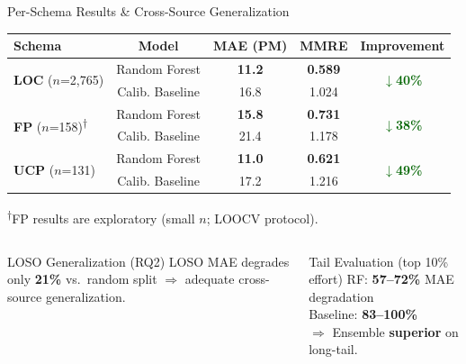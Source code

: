 \documentclass[aspectratio=169]{beamer}
\begin{document}
\begin{frame}{Per-Schema Results \& Cross-Source Generalization}

\begin{table}
\centering
{\setlength{\tabcolsep}{6pt}\footnotesize
\begin{tabular}{lcccc}
\toprule
\textbf{Schema} & \textbf{Model} & \textbf{MAE (PM)} & \textbf{MMRE} & \textbf{Improvement} \\
\midrule
\multirow{2}{*}{\textbf{LOC} ($n$=2,765)}
  & Random Forest        & \textbf{11.2} & \textbf{0.589} & \multirow{2}{*}{\textcolor{darkgreen}{\textbf{$\downarrow$40\%}}} \\
  & Calib. Baseline      & 16.8          & 1.024          & \\
\midrule
\multirow{2}{*}{\textbf{FP} ($n$=158)\textsuperscript{$\dagger$}}
  & Random Forest        & \textbf{15.8} & \textbf{0.731} & \multirow{2}{*}{\textcolor{darkgreen}{\textbf{$\downarrow$38\%}}} \\
  & Calib. Baseline      & 21.4          & 1.178          & \\
\midrule
\multirow{2}{*}{\textbf{UCP} ($n$=131)}
  & Random Forest        & \textbf{11.0} & \textbf{0.621} & \multirow{2}{*}{\textcolor{darkgreen}{\textbf{$\downarrow$49\%}}} \\
  & Calib. Baseline      & 17.2          & 1.216          & \\
\bottomrule
\end{tabular}}
\end{table}
{\tiny \textsuperscript{$\dagger$}FP results are exploratory (small $n$; LOOCV protocol).}

\vspace{0.1cm}
\begin{columns}[T]
\begin{exampleblock}{LOSO Generalization (RQ2)}
\small LOSO MAE degrades only \textbf{21\%} vs.~random split $\Rightarrow$ adequate cross-source generalization.
\end{exampleblock}

\begin{exampleblock}{Tail Evaluation (top 10\% effort)}
\small RF: \textbf{57--72\%} MAE degradation\\
Baseline: \textbf{83--100\%}\\
$\Rightarrow$ Ensemble \textbf{superior} on long-tail.
\end{exampleblock}
\end{columns}
\end{frame}
\end{document}
